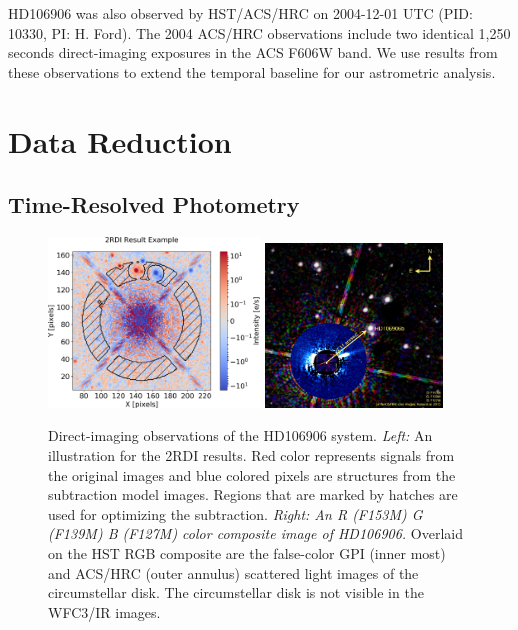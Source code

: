 \documentclass[twocolumn]{aastex62}
\begin{document}
HD106906 was also observed by HST/ACS/HRC on 2004-12-01 UTC (PID: 10330, PI: H. Ford). The 2004 ACS/HRC observations include two identical 1,250 seconds direct-imaging exposures in the ACS F606W  band. We use results  from these observations \citep{Bailey2013,Kalas2015} to extend the temporal baseline for our astrometric analysis.

\section{Data Reduction}

\subsection{Time-Resolved Photometry}
\begin{figure}
  \centering  \includegraphics[width=0.5\textwidth]{figures/F153M_medianSubtractionMasked_rotation_01}  
  \includegraphics[width=0.42\textwidth]{figures/HD106906_RGB_composite}  
  \caption[Direct-imaging observations of the HD106906 system.]{Direct-imaging observations of the HD106906 system. \emph{Left:} An illustration for the 2RDI results. Red color represents signals from the original images and blue colored pixels are structures from the subtraction model images. Regions that are marked by hatches are used for optimizing the subtraction. \emph{Right: An R (F153M) G (F139M) B (F127M) color composite image of HD106906.} Overlaid on the HST RGB composite are the false-color GPI (inner most) and ACS/HRC (outer annulus) scattered light images \citep{Kalas2015} of the circumstellar disk. The circumstellar disk is not visible in the WFC3/IR images.}
  \label{fig:2rdi}
\end{figure}
\end{document}
